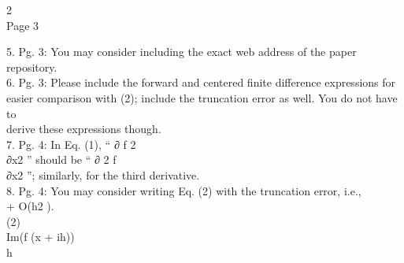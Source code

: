 2 \\

Page 3

5. Pg. 3: You may consider including the exact web address of the paper
repository. \\6. Pg. 3: Please include the forward and centered ﬁnite
difference expressions for \\easier comparison with (2); include the
truncation error as well. You do not have to \\derive these expressions
though. \\7. Pg. 4: In Eq. (1), `` ∂ f 2 \\∂x2 '' should be `` ∂ 2 f
\\∂x2 ''; similarly, for the third derivative. \\8. Pg. 4: You may
consider writing Eq. (2) with the truncation error, i.e., \\

+ O(h2 ). \\

(2) \\

Im(f (x + ih)) \\h \\

